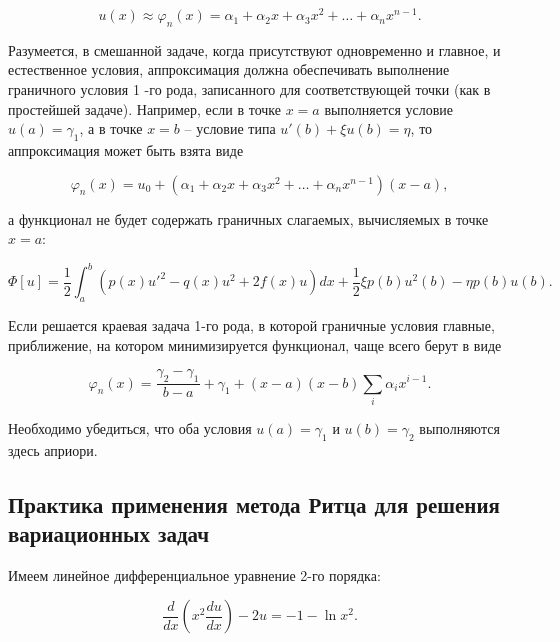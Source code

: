 \documentclass{article}
\begin{document}
\begin{displaymath}
	u(x) \approx \varphi_{n}(x) = \alpha_{1} + \alpha_{2}x + \alpha_{3}x^{2} + \dots + \alpha_{n}x^{n-1}.
\end{displaymath}

Разумеется, в смешанной задаче, когда присутствуют одновременно и главное, и естественное условия, аппроксимация должна обеспечивать выполнение граничного условия 1 -го рода, записанного для соответствующей точки (как в простейшей задаче). Например, если в точке $x = a$ выполняется условие $u(a) = \gamma_{1}$, а в точке $x = b$ -- условие типа $u'(b) + \xi u(b) = \eta$, то аппроксимация может быть взята виде

\begin{displaymath}
	\varphi_{n}(x) = u_{0} + \left( \alpha_{1} + \alpha_{2}x + \alpha_{3}x^{2} + \dots + \alpha_{n}x^{n-1} \right) \left( x - a \right),
\end{displaymath}

\noindent а функционал не будет содержать граничных слагаемых, вычисляемых в точке $x = a$:

\begin{displaymath}
	\Phi[u] = \frac{1}{2} \int_{a}^{b} \left( p(x)u'^{2} - q(x)u^{2} + 2f(x)u \right)dx + \frac{1}{2} \xi p(b) u^{2}(b) - \eta p(b)u(b).
\end{displaymath}

Если решается краевая задача 1-го рода, в которой граничные условия главные, приближение, на котором минимизируется функционал, чаще всего берут в виде

\begin{displaymath}
	\varphi_{n}(x) = \frac{\gamma_{2} - \gamma_{1} }{ b - a } + \gamma_{1} + (x-a)(x-b) \sum_{i} \alpha_{i} x^{i - 1}.
\end{displaymath}

\begin{warn}[Важно!]
	Необходимо убедиться, что оба условия $u(a) = \gamma_{1}$ и $u(b) = \gamma_{2}$ выполняются здесь априори.
\end{warn}

\subsection{Практика применения метода Ритца для решения вариационных задач}

Имеем линейное дифференциальное уравнение 2-го порядка:

\begin{displaymath}
	\frac{d}{dx} \left( x^2 \frac{d u}{dx} \right) - 2u = -1 - \ln{x^2}.
\end{displaymath}
\end{document}
